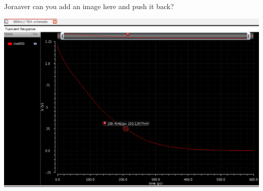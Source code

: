 \documentclass[12pt]{article}
\begin{document}
	Joraaver can you add an image here and push it back?

\includegraphics{AndDelay.png}
\end{document}
